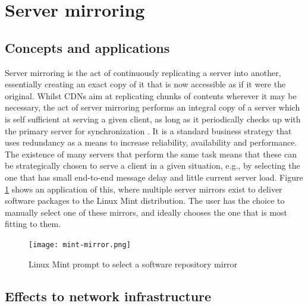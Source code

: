 \documentclass[
  oneside,
  11pt, a4paper,
  footinclude=true,
  headinclude=true,
  cleardoublepage=empty
]{scrbook}
\begin{document}
	
	
	\section{Server mirroring}
	\subsection{Concepts and applications}
	
	Server mirroring is the act of continuously replicating a server into another, essentially creating an exact copy of it that is now accessible as if it were the original. Whilst CDNs aim at replicating chunks of contents wherever it may be necessary, the act of server mirroring performs an integral copy of a server which is self sufficient at serving a given client, as long as it periodically checks up with the primary server for synchronization . It is a standard business strategy that uses redundancy as a means to increase reliability, availability and performance. The existence of many servers that perform the same task means that these can be strategically chosen to serve a client in a given situation, e.g., by selecting the one that has small end-to-end message delay and little current server load. Figure \ref{fig:mint-mirrors} shows an application of this, where multiple server mirrors exist to deliver software packages to the Linux Mint distribution. The user has the choice to manually select one of these mirrors, and ideally chooses the one that is most fitting to them.
	
	\begin{figure}[!h]
    \centering
    \texttt{[image: mint-mirror.png]}
    \caption{Linux Mint prompt to select a software repository mirror}
    \label{fig:mint-mirrors}
    \end{figure}
	
	\subsection{Effects to network infrastructure}
	
\end{document}
